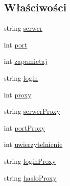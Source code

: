 \subsection*{Właściwości}
\begin{CompactItemize}
\item 
string \hyperlink{a00006_58979a131d2e8358e44308d5a118a3c8}{serwer}
\item 
int \hyperlink{a00006_e6f12910fa52538a1986af8dc8f72a27}{port}
\item 
int \hyperlink{a00006_a0c8d040782f8be937e5d26480912e4a}{zapamietaj}
\item 
string \hyperlink{a00006_f3bda91b7c72f21c0104a4fc968783b8}{login}
\item 
int \hyperlink{a00006_94b389129069b4c16d8c5cf1155321e3}{proxy}
\item 
string \hyperlink{a00006_2d630192bb1ad9a8ce0553ff7915196e}{serwerProxy}
\item 
int \hyperlink{a00006_15ac59e5d9a8cff1a3a7c550a44b0d19}{portProxy}
\item 
int \hyperlink{a00006_b3f28fbc37dd9282cbd8e62b783132f6}{uwierzytelnienie}
\item 
string \hyperlink{a00006_5cb86029bc717dfc2e0c8dc4ee07895e}{loginProxy}
\item 
string \hyperlink{a00006_ec8c39eccc075a5fb2535ca3a9b5be8e}{hasloProxy}
\end{CompactItemize}
